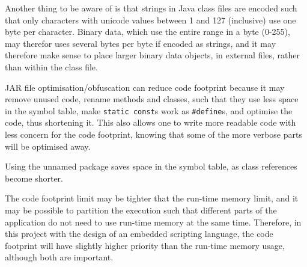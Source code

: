 \documentclass[11pt]{report}
\begin{document}
Another thing to be aware of is that strings in Java class files are encoded such that only characters with unicode values between 1 and 127 (inclusive) use one byte per character. 
Binary data, which use the entire range in a byte (0-255), may therefor uses several bytes per byte if encoded as strings, and it may therefore make sense to place larger binary data objects, in external files, rather than within the class file.

JAR file optimisation/obfuscation can reduce code footprint because it may
remove unused code,
rename methods and classes, such that they use less space in the symbol table,
make \verb|static const|s work as \verb|#define|s,
 and optimise the code, thus shortening it.
This also allows one to write more readable code with less concern for the code footprint, knowing that some of the more verbose parts will be optimised away.

Using the unnamed package saves space in the symbol table, as class references become shorter.

The code footprint limit may be tighter that the run-time memory limit, and it may be possible to partition the execution such that different parts of the application do not need to use run-time memory at the same time.
Therefore, in this project with the design of an embedded scripting language, the code footprint will have slightly higher priority than the run-time memory usage, although both are important.


\end{document}
